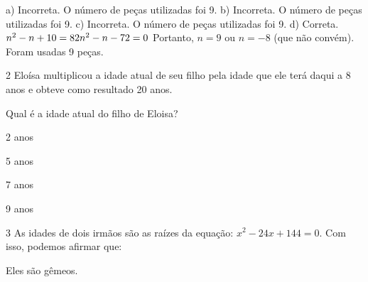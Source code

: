 \begin{escolha}
\begin{boxmedio}
\begin{boxmedio}
{\begin{boxpeq}
\begin{boxpeq}
{\begin{boxpeq}
\begin{boxmedio}
\begin{boxmedio}
\begin{boxpeq}
\begin{boxmedio}
\begin{boxpeq}
\begin{boxpeq}
\begin{boxpeq}
\begin{boxpeq}
\begin{boxmedio}
{\begin{boxmedio}
\begin{boxmedio}
\begin{boxpeq}
\begin{boxmedio}
\begin{boxpeq}
\begin{boxpeq}
\begin{boxpeq}
\begin{escolha}
{\begin{boxmedio}
\begin{boxpeq}
\begin{boxpeq}
\begin{boxpeq}
\begin{boxpeq}
\begin{boxpeq}
\begin{boxmedio}
\begin{boxpeq}
\begin{boxpeq}
\begin{boxpeq}
{a) Incorreta. O número de peças utilizadas foi 9.
b) Incorreta. O número de peças utilizadas foi 9.
c) Incorreta. O número de peças utilizadas foi 9.
d) Correta. $n^2 - n + 10 = 82 \\ 
n^2 - n - 72 = 0$
Portanto, $n = 9$ ou $n = - 8$ (que não convém). 
Foram usadas 9 peças.}

\num{2} Eloísa multiplicou a idade atual de seu filho pela idade que ele terá
daqui a 8 anos e obteve como resultado 20 anos.

Qual é a idade atual do filho de Eloisa?

\begin{escolha}

  \item 2 anos

  \item 5 anos

  \item 7 anos

  \item 9 anos

\end{escolha}


\num{3} As idades de dois irmãos são as raízes da equação: 
$x^2 - 24x + 144 = 0$. Com isso, podemos afirmar que:

\begin{escolha}
  \item Eles são gêmeos.


\end{escolha}
\end{boxpeq}
\end{boxpeq}
\end{boxpeq}
\end{boxmedio}
\end{boxpeq}
\end{boxpeq}
\end{boxpeq}
\end{boxpeq}
\end{boxpeq}
\end{boxmedio}}
\end{escolha}
\end{boxpeq}
\end{boxpeq}
\end{boxpeq}
\end{boxmedio}
\end{boxpeq}
\end{boxmedio}
\end{boxmedio}}
\end{boxmedio}
\end{boxpeq}
\end{boxpeq}
\end{boxpeq}
\end{boxpeq}
\end{boxmedio}
\end{boxpeq}
\end{boxmedio}
\end{boxmedio}
\end{boxpeq}}
\end{boxpeq}
\end{boxpeq}}
\end{boxmedio}
\end{boxmedio}
\end{escolha}
